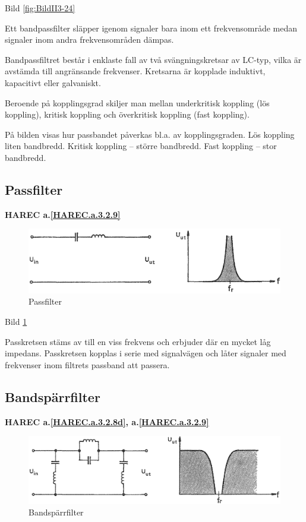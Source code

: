 Bild \ref{fig:BildII3-24}

Ett bandpassfilter släpper igenom signaler bara inom ett frekvensområde medan
signaler inom andra frekvensområden dämpas.

Bandpassfiltret består i enklaste fall av två svängningskretsar av LC-typ, vilka
är avstämda till angränsande frekvenser. Kretsarna är kopplade induktivt,
kapacitivt eller galvaniskt.

Beroende på kopplingsgrad skiljer man mellan underkritisk koppling (lös
koppling), kritisk koppling och överkritisk koppling (fast koppling).

På bilden visas hur passbandet påverkas bl.a. av kopplingsgraden. Lös koppling
liten bandbredd. Kritisk koppling -- större bandbredd. Fast koppling -- stor
bandbredd.

\subsection{Passfilter}
\textbf{HAREC
  a.\ref{HAREC.a.3.2.9}\label{myHAREC.a.3.2.9d}
}

\begin{figure}
\includegraphics[width=\textwidth]{images/cropped_pdfs/bild_2_3-25.pdf}
\caption{Passfilter}
\label{fig:BildII3-25}
\end{figure}

Bild \ref{fig:BildII3-25}

Passkretsen stäms av till en viss frekvens och erbjuder där en mycket låg
impedans. Passkretsen kopplas i serie med signalvägen och låter signaler med
frekvenser inom filtrets passband att passera.

\subsection{Bandspärrfilter}
\textbf{HAREC
  a.\ref{HAREC.a.3.2.8d}\label{myHAREC.a.3.2.8d},
  a.\ref{HAREC.a.3.2.9}\label{myHAREC.a.3.2.9e}
}

\begin{figure}
\includegraphics[width=\textwidth]{images/cropped_pdfs/bild_2_3-26.pdf}
\caption{Bandspärrfilter}
\label{fig:BildII3-26}
\end{figure}

